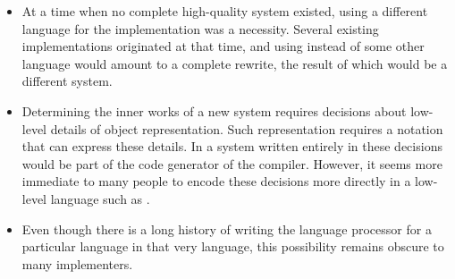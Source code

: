 \begin{itemize}
\item At a time when no complete high-quality \commonlisp{} system
  existed, using a different language for the implementation was a
  necessity.  Several existing implementations originated at that
  time, and using \commonlisp{} instead of some other language would
  amount to a complete rewrite, the result of which would be a
  different system.
\item Determining the inner works of a new \commonlisp{} system
  requires decisions about low-level details of object
  representation.  Such representation requires a notation that can
  express these details.  In a \commonlisp{} system written entirely
  in \commonlisp{} these decisions would be part of the code generator
  of the compiler.  However, it seems more immediate to many people to
  encode these decisions more directly in a low-level language such as
  \clanguage{}.
\item Even though there is a long history of writing the language
  processor for a particular language in that very language, this
  possibility remains obscure to many implementers.
\end{itemize}
